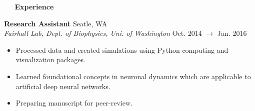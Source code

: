 \documentclass[a4paper,12pt]{article}
\newcommand{\resheading}[1]{{\vspace*{.06in} \colorbox{mygrey}{\begin{minipage}{\textwidth}{\textmd{\large \textbf{#1} \vphantom{p\^{E}}}}\end{minipage}}} }
\newcommand{\ressubheading}[4]{
        \textbf{#1} \hfill #2\\
        \textit{#3} \hfill #4 \\}
\begin{document}
%
%    
%    
%    
\resheading{~\faBriefcase~ Experience}


\ressubheading{Research Assistant}{Seatle, WA}{Fairhall Lab, Dept. of Biophysics, Uni. of Washington}{Oct. 2014 $\rightarrow$ Jan. 2016}
\begin{itemize}[noitemsep,topsep=0pt,parsep=0pt,partopsep=0pt, nolistsep]
\item Processed data and created simulations using Python computing and visualization packages.
\item Learned foundational concepts in neuronal dynamics which are applicable to artificial deep neural networks.
\item Preparing manuscript for peer-review.
\end{itemize}
 
\end{document}
